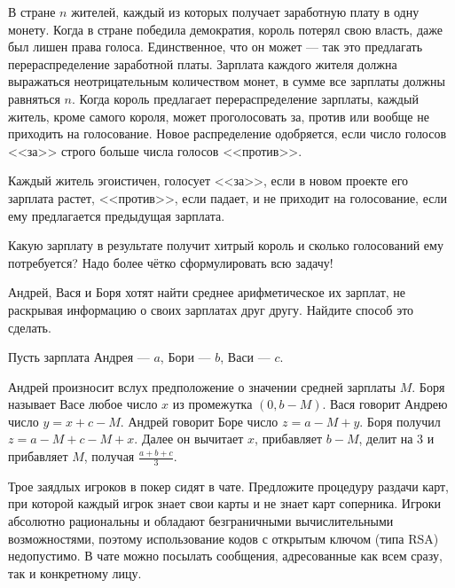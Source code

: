 \begin{problem}
В стране  $n$  жителей, каждый из которых получает заработную плату в одну монету. Когда в стране победила демократия, король потерял свою власть, даже был лишен права голоса. Единственное, что он может --- так это предлагать перераспределение заработной платы. Зарплата каждого жителя должна выражаться неотрицательным количеством монет, в сумме все зарплаты должны равняться  $n$. Когда король предлагает перераспределение зарплаты, каждый житель, кроме самого короля, может проголосовать за, против или вообще не приходить на голосование. Новое распределение одобряется, если число голосов <<за>> строго больше числа голосов <<против>>.\par
Каждый житель эгоистичен, голосует <<за>>, если в новом проекте его зарплата растет, <<против>>, если падает, и не приходит на голосование, если ему предлагается предыдущая зарплата.\par
Какую зарплату в результате получит хитрый король и сколько голосований ему потребуется?
{\red Надо более чётко сформулировать всю задачу!}



\begin{sol}

\end{sol}
\end{problem}



\begin{problem}
 Андрей, Вася и Боря хотят найти среднее арифметическое их зарплат, не раскрывая информацию о своих зарплатах друг другу. Найдите способ это сделать.



\begin{sol}

Пусть зарплата Андрея --- $a$, Бори --- $b$, Васи --- $c$.

Андрей произносит вслух предположение о значении средней зарплаты $M$.
Боря называет Васе любое число $x$ из промежутка $(0, b-M)$. Вася говорит Андрею число $y=x+c-M$. Андрей говорит Боре число $z= a-M+y$. Боря получил $z = a-M+c-M+x$. Далее он вычитает $x$, прибавляет $b-M$, делит на 3 и прибавляет $M$, получая $\frac{a+b+c}{3}$.
\end{sol}
\end{problem}



\begin{problem}
Трое заядлых игроков в покер сидят в чате. Предложите процедуру раздачи карт, при которой каждый игрок знает свои карты и не знает карт соперника. Игроки абсолютно рациональны и обладают безграничными вычислительными возможностями, поэтому использование кодов с открытым ключом (типа RSA) недопустимо. В чате можно посылать сообщения, адресованные как всем сразу, так и конкретному лицу.\par



\begin{sol}

\end{sol}
\end{problem}




